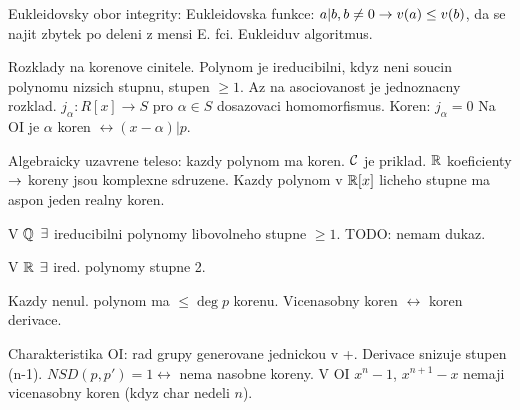 Eukleidovsky obor integrity: Eukleidovska funkce: $a|b,b\neq 0\rightarrow v(a)\leq
v(b)$, da se najit zbytek po deleni z mensi E. fci. Eukleiduv algoritmus.

Rozklady na korenove cinitele.
Polynom je ireducibilni, kdyz neni soucin polynomu nizsich stupnu, stupen $\geq
1$. Az na asociovanost je jednoznacny rozklad.
$j_\alpha:R[x]\rightarrow S$ pro $\alpha\in S$ dosazovaci homomorfismus.
Koren: $j_\alpha=0$
Na OI je $\alpha$ koren $\leftrightarrow (x-\alpha)|p$.

Algebraicky uzavrene teleso: kazdy polynom ma koren.
$\mathcal{C}$ je priklad. $\mathbb{R}$ koeficienty $\rightarrow$ koreny jsou komplexne sdruzene.
Kazdy polynom v $\mathbb{R}[x]$ licheho stupne ma aspon jeden realny koren.

V $\mathbb{Q}$ $\exists$ ireducibilni polynomy libovolneho stupne $\geq 1$.
TODO: nemam dukaz.

V $\mathbb{R}$ $\exists$ ired. polynomy stupne 2.

Kazdy nenul. polynom ma $\leq\deg p$ korenu. Vicenasobny koren
$\leftrightarrow$ koren derivace.

Charakteristika OI: rad grupy generovane jednickou v +.
Derivace snizuje stupen (n-1).
$NSD(p,p')=1\leftrightarrow$ nema nasobne koreny.
V OI $x^n-1$, $x^{n+1}-x$ nemaji vicenasobny koren (kdyz char nedeli $n$).
